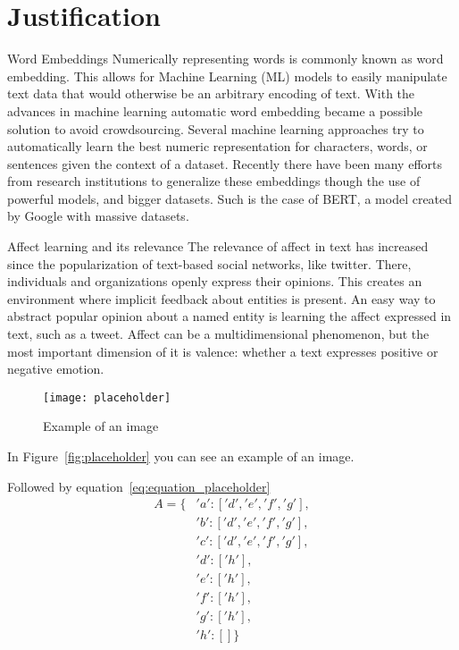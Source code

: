 \section{Justification}\label{sec:Justification}

Word Embeddings
Numerically representing words is commonly known as word embedding. This allows for Machine Learning (ML) models to easily manipulate text data that would otherwise be an arbitrary encoding of text. With the advances in machine learning automatic word embedding became a possible solution to avoid crowdsourcing. %
Several machine learning approaches try to automatically learn the best numeric representation for characters, words, or sentences given the context of a dataset. Recently there have been many efforts from research institutions to generalize these embeddings though the use of powerful models, and bigger datasets. Such is the case of BERT, a model created by Google with massive datasets.

Affect learning and its relevance
The relevance of affect in text has increased since the popularization of text-based social networks, like twitter. There, individuals and organizations openly express their opinions. This creates an environment where implicit feedback about entities is present. An easy way to abstract popular opinion about a named entity is learning the affect expressed in text, such as a tweet. Affect can be a multidimensional phenomenon, but the most important dimension of it is valence: whether a text expresses positive or negative emotion.


\begin{figure}[H]
  \texttt{[image: placeholder]}
  \centering
  \caption{Example of an image}
\end{figure}\label{fig:placeholder}


In Figure~\ref{fig:placeholder} you can see an example of an image.

Followed by equation~\ref{eq:equation_placeholder}
\begin{equation} \label{eq:equation_placeholder}
  \begin{split}
    A = \{&'a':['d','e','f','g'], \\
         &'b':['d','e','f','g'], \\
         &'c':['d','e','f','g'], \\
         &'d':['h'], \\
         &'e':['h'], \\
         &'f':['h'], \\
         &'g':['h'], \\
         &'h':[] \}
  \end{split}
\end{equation}

